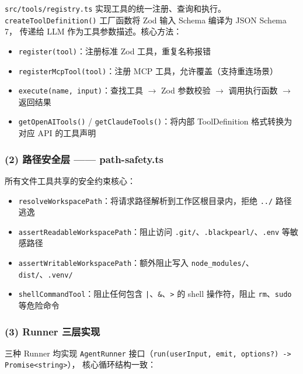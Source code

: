 \documentclass[12pt,a4paper]{ctexart}
\begin{document}
\texttt{src/tools/registry.ts} 实现工具的统一注册、查询和执行。
\texttt{createToolDefinition()} 工厂函数将 Zod 输入 Schema 编译为 JSON Schema 7，
传递给 LLM 作为工具参数描述。核心方法：

\begin{itemize}
  \item \texttt{register(tool)}：注册标准 Zod 工具，重复名称报错
  \item \texttt{registerMcpTool(tool)}：注册 MCP 工具，允许覆盖（支持重连场景）
  \item \texttt{execute(name, input)}：查找工具 $\to$ Zod 参数校验
    $\to$ 调用执行函数 $\to$ 返回结果
  \item \texttt{getOpenAITools()} /
    \texttt{getClaudeTools()}：将内部 ToolDefinition 格式转换为对应 API 的工具声明
\end{itemize}

\subsubsection{(2) 路径安全层 —— path-safety.ts}

所有文件工具共享的安全约束核心：

\begin{itemize}
  \item \texttt{resolveWorkspacePath}：将请求路径解析到工作区根目录内，拒绝
    \texttt{../} 路径逃逸
  \item \texttt{assertReadableWorkspacePath}：阻止访问
    \texttt{.git/}、\texttt{.blackpearl/}、\texttt{.env} 等敏感路径
  \item \texttt{assertWritableWorkspacePath}：额外阻止写入
    \texttt{node\_modules/}、\texttt{dist/}、\texttt{.venv/}
  \item \texttt{shellCommandTool}：阻止任何包含
    \texttt{|}、\texttt{\&}、\texttt{>} 的 shell 操作符，阻止
    \texttt{rm}、\texttt{sudo} 等危险命令
\end{itemize}

\subsubsection{(3) Runner 三层实现}

三种 Runner 均实现 \texttt{AgentRunner}
接口（\verb|run(userInput, emit, options?) -> Promise<string>|），
核心循环结构一致：
\end{document}
